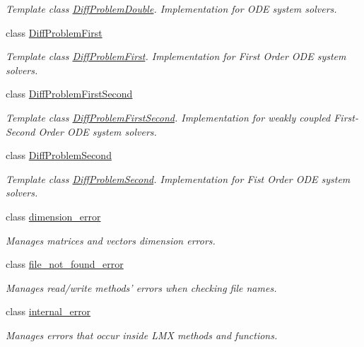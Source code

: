 \begin{DoxyCompactItemize}
\begin{DoxyCompactList}\small\item\em Template class \hyperlink{classlmx_1_1DiffProblemDouble}{Diff\-Problem\-Double}. Implementation for O\-D\-E system solvers. \end{DoxyCompactList}\item 
class \hyperlink{classlmx_1_1DiffProblemFirst}{Diff\-Problem\-First}
\begin{DoxyCompactList}\small\item\em Template class \hyperlink{classlmx_1_1DiffProblemFirst}{Diff\-Problem\-First}. Implementation for First Order O\-D\-E system solvers. \end{DoxyCompactList}\item 
class \hyperlink{classlmx_1_1DiffProblemFirstSecond}{Diff\-Problem\-First\-Second}
\begin{DoxyCompactList}\small\item\em Template class \hyperlink{classlmx_1_1DiffProblemFirstSecond}{Diff\-Problem\-First\-Second}. Implementation for weakly coupled First-\/\-Second Order O\-D\-E system solvers. \end{DoxyCompactList}\item 
class \hyperlink{classlmx_1_1DiffProblemSecond}{Diff\-Problem\-Second}
\begin{DoxyCompactList}\small\item\em Template class \hyperlink{classlmx_1_1DiffProblemSecond}{Diff\-Problem\-Second}. Implementation for Fist Order O\-D\-E system solvers. \end{DoxyCompactList}\item 
class \hyperlink{classlmx_1_1dimension__error}{dimension\-\_\-error}
\begin{DoxyCompactList}\small\item\em Manages matrices and vectors dimension errors. \end{DoxyCompactList}\item 
class \hyperlink{classlmx_1_1file__not__found__error}{file\-\_\-not\-\_\-found\-\_\-error}
\begin{DoxyCompactList}\small\item\em Manages read/write methods' errors when checking file names. \end{DoxyCompactList}\item 
class \hyperlink{classlmx_1_1internal__error}{internal\-\_\-error}
\begin{DoxyCompactList}\small\item\em Manages errors that occur inside L\-M\-X methods and functions. \end{DoxyCompactList}\item 

\end{DoxyCompactItemize}
